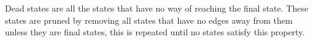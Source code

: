 Dead states are all the states that have no way of reaching the final state.
These states are pruned by removing all states that have no edges away from them unless they are final states, this is repeated until no states satisfy this property.

